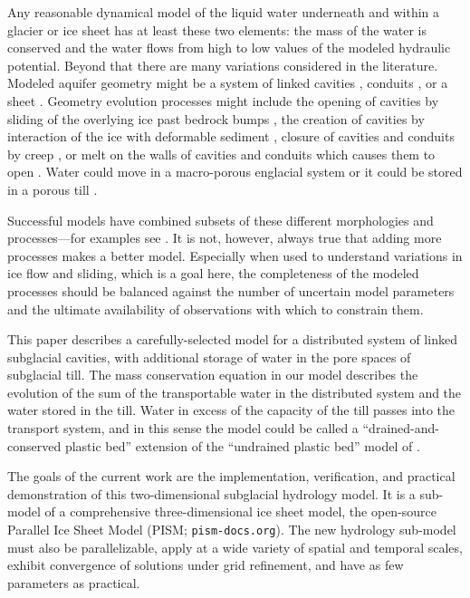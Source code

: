 \documentclass[gmd]{copernicus}   %
\begin{document}
\introduction

Any reasonable dynamical model of the liquid water underneath and within a glacier or ice sheet has at least these two elements: the mass of the water is conserved and the water flows from high to low values of the modeled hydraulic potential.  Beyond that there are many variations considered in the literature.  Modeled aquifer geometry might be a system of linked cavities \citep{Kamb1987}, conduits \citep{Nye1976}, or a sheet \citep{CreytsSchoof2009}.  Geometry evolution processes might include the opening of cavities by sliding of the overlying ice past bedrock bumps \citep{Schoof2005cavitation}, the creation of cavities by interaction of the ice with deformable sediment \citep{Schoof2007deformable}, closure of cavities and conduits by creep \citep{Hewitt2011}, or melt on the walls of cavities and conduits which causes them to open \citep{Clarke05}.  Water could move in a macro-porous englacial system \citep{Bartholomausetal2011,Harperetal2010} or it could be stored in a porous till \citep{Tulaczyketal2000}.

Successful models have combined subsets of these different morphologies and processes---for examples see \cite{FlowersClarke2002_theory,Hewitt2013,vanderWeletal2013,Werderetal2013,deFleurianetal2014}.  It is not, however, always true that adding more processes makes a better model.  Especially when used to understand variations in ice flow and sliding, which is a goal here, the completeness of the modeled processes should be balanced against the number of uncertain model parameters and the ultimate availability of observations with which to constrain them.

This paper describes a carefully-selected model for a distributed system of linked subglacial cavities, with additional storage of water in the pore spaces of subglacial till.  The mass conservation equation in our model describes the evolution of the sum of the transportable water in the distributed system and the water stored in the till.  Water in excess of the capacity of the till passes into the transport system, and in this sense the model could be called a ``drained-and-conserved plastic bed'' extension of the ``undrained plastic bed'' model of \cite{Tulaczyketal2000b}.

The goals of the current work are the implementation, verification, and practical demonstration of this two-dimensional subglacial hydrology model.  It is a sub-model of a comprehensive three-dimensional ice sheet model, the open-source Parallel Ice Sheet Model (PISM; \texttt{pism-docs.org}).  The new hydrology sub-model must also be parallelizable, apply at a wide variety of spatial and temporal scales, exhibit convergence of solutions under grid refinement, and have as few parameters as practical.
\end{document}
